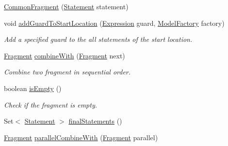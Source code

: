\begin{DoxyCompactItemize}
\item 
\hyperlink{classedu_1_1udel_1_1cis_1_1vsl_1_1civl_1_1model_1_1common_1_1CommonFragment_a649751e7f4b6894d350684d5f7670273}{Common\+Fragment} (\hyperlink{interfaceedu_1_1udel_1_1cis_1_1vsl_1_1civl_1_1model_1_1IF_1_1statement_1_1Statement}{Statement} statement)
\item 
void \hyperlink{classedu_1_1udel_1_1cis_1_1vsl_1_1civl_1_1model_1_1common_1_1CommonFragment_ae5fc3b65a444cf29ce316756970ac252}{add\+Guard\+To\+Start\+Location} (\hyperlink{interfaceedu_1_1udel_1_1cis_1_1vsl_1_1civl_1_1model_1_1IF_1_1expression_1_1Expression}{Expression} guard, \hyperlink{interfaceedu_1_1udel_1_1cis_1_1vsl_1_1civl_1_1model_1_1IF_1_1ModelFactory}{Model\+Factory} factory)
\begin{DoxyCompactList}\small\item\em Add a specified guard to the all statements of the start location. \end{DoxyCompactList}\item 
\hyperlink{interfaceedu_1_1udel_1_1cis_1_1vsl_1_1civl_1_1model_1_1IF_1_1Fragment}{Fragment} \hyperlink{classedu_1_1udel_1_1cis_1_1vsl_1_1civl_1_1model_1_1common_1_1CommonFragment_ab34e2434e334825ba7ad51c20fefc234}{combine\+With} (\hyperlink{interfaceedu_1_1udel_1_1cis_1_1vsl_1_1civl_1_1model_1_1IF_1_1Fragment}{Fragment} next)
\begin{DoxyCompactList}\small\item\em Combine two fragment in sequential order. \end{DoxyCompactList}\item 
boolean \hyperlink{classedu_1_1udel_1_1cis_1_1vsl_1_1civl_1_1model_1_1common_1_1CommonFragment_a0772702fd6c57a4d8aebf7bd8a9aa3cc}{is\+Empty} ()
\begin{DoxyCompactList}\small\item\em Check if the fragment is empty. \end{DoxyCompactList}\item 
Set$<$ \hyperlink{interfaceedu_1_1udel_1_1cis_1_1vsl_1_1civl_1_1model_1_1IF_1_1statement_1_1Statement}{Statement} $>$ \hyperlink{classedu_1_1udel_1_1cis_1_1vsl_1_1civl_1_1model_1_1common_1_1CommonFragment_ab4e81c16318800dbdc9586d686879d8d}{final\+Statements} ()
\item 
\hyperlink{interfaceedu_1_1udel_1_1cis_1_1vsl_1_1civl_1_1model_1_1IF_1_1Fragment}{Fragment} \hyperlink{classedu_1_1udel_1_1cis_1_1vsl_1_1civl_1_1model_1_1common_1_1CommonFragment_a1363d11a0463b79ee0e3f8f5b5f08205}{parallel\+Combine\+With} (\hyperlink{interfaceedu_1_1udel_1_1cis_1_1vsl_1_1civl_1_1model_1_1IF_1_1Fragment}{Fragment} parallel)

\end{DoxyCompactItemize}
